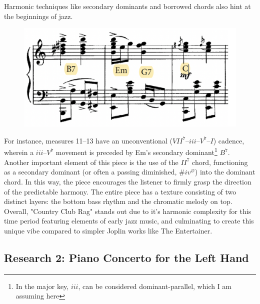 \documentclass[11pt,a4paper]{article}
\begin{document}
Harmonic techniques like secondary dominants and borrowed chords also hint at the beginnings of jazz. 
\begin{figure}[ht]
\begin{center}
\includegraphics[width=0.4\linewidth]{joplin3}
\end{center}
\end{figure}
For instance, measures 11–13 have an unconventional ($VII^7–iii–V^7–I$) cadence, wherein a $iii–V^7$ movement is preceded by Em's secondary dominant\footnote{In the major key, $iii$, can be considered dominant-parallel, which I am assuming here} $B^7$. Another important element of this piece is the use of the $II^7$ chord, functioning as a secondary dominant (or often a passing diminished, $\# iv^{\varnothing}$) into the dominant chord. In this way, the piece encourages the listener to firmly grasp the direction of the predictable harmony. The entire piece has a texture consisting of two distinct layers: the bottom bass rhythm and the chromatic melody on top. Overall, "Country Club Rag" stands out due to it's harmonic complexity for this time period featuring elements of early jazz music, and culminating to create this unique vibe compared to simpler Joplin works like The Entertainer.


\subsection{Research 2: Piano Concerto for the Left Hand}
\end{document}
